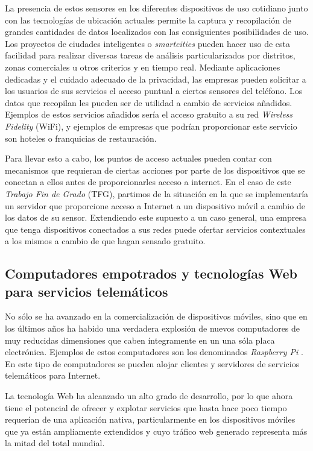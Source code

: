 La presencia de estos sensores en los diferentes dispositivos de uso cotidiano junto con las tecnologías de ubicación actuales permite la captura y recopilación de grandes cantidades de datos localizados con las consiguientes posibilidades de uso. Los proyectos de ciudades inteligentes o \emph{smartcities} pueden hacer uso de esta facilidad para realizar diversas tareas de análisis particularizados por distritos, zonas comerciales u otros criterios y en tiempo real. Mediante aplicaciones dedicadas y el cuidado adecuado de la privacidad, las empresas pueden solicitar a los usuarios de sus servicios el acceso puntual a ciertos sensores del teléfono. Los datos que recopilan les pueden ser de utilidad a cambio de servicios añadidos. Ejemplos de estos servicios añadidos sería el acceso gratuito a su red \emph{Wireless Fidelity} (\acrshort{WiFi}), y ejemplos de empresas que podrían proporcionar este servicio son hoteles o franquicias de restauración.

Para llevar esto a cabo, los puntos de acceso actuales pueden contar con mecanismos que requieran de ciertas acciones por parte de los dispositivos que se conectan a ellos antes de proporcionarles acceso a internet. En el caso de este \emph{Trabajo Fin de Grado} (TFG), partimos de la situación en la que se implementaría un servidor que proporcione acceso a Internet a un dispositivo móvil a cambio de los datos de su sensor. Extendiendo este supuesto a un caso general, una empresa que tenga dispositivos conectados a sus redes puede ofertar servicios contextuales a los mismos a cambio de que hagan sensado gratuito.

\subsection{Computadores empotrados y tecnologías Web para servicios telemáticos}

No sólo se ha avanzado en la comercialización de dispositivos móviles, sino que en los últimos años ha habido una verdadera explosión de nuevos computadores de muy reducidas dimensiones que caben íntegramente en un una sóla placa electrónica. Ejemplos de estos computadores son los denominados \emph{Raspberry Pi} \cite{RasPi1}. En este tipo de computadores se pueden alojar clientes y servidores de servicios telemáticos para Internet.

La tecnología Web ha alcanzado un alto grado de desarrollo, por lo que ahora tiene el potencial de ofrecer y explotar servicios que hasta hace poco tiempo requerían de una aplicación nativa, particularmente en los dispositivos móviles que ya están ampliamente extendidos y cuyo tráfico web generado representa más la mitad del total mundial.
 
